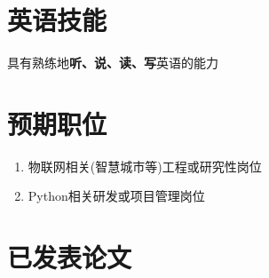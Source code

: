 \documentclass[10pt]{article} %
\begin{document}
\begin{paracol}{2}
	
	\section{英语技能}
	
	
	
	
	具有熟练地\textbf{听、说、读、写}英语的能力
	
	
	
	

		
	\switchcolumn
	\section{预期职位}
	
	\begin{enumerate}[font=\color{headings}\bfseries] %
		
		
		\item 物联网相关(智慧城市等)工程或研究性岗位
		
		
		\item Python相关研发或项目管理岗位
	\end{enumerate}
	\section{已发表论文}
	
	

\end{paracol}
\end{document}

